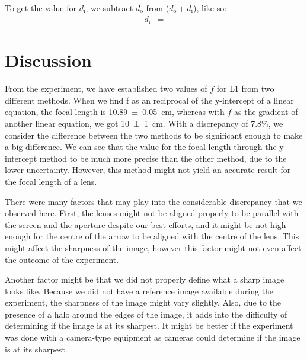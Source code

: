 \documentclass[letter,12pt]{article}
\numberwithin{equation}{section}
\numberwithin{figure}{section}
\numberwithin{table}{section}
\newcommand{\dist}[1] {\(d_{\mathrm{#1}}\)}
\newcommand{\mdist}[1] {d_{\mathrm{#1}}}
\begin{document}
To get the value for \dist{i}, we subtract \dist{o} from (\(\mdist{o} + \mdist{i}\)), like so:
\begin{align*}
  \mdist{i} &= 
\end{align*}


\section{Discussion}
From the experiment, we have established two values of \(f\) for L1 from two different methods. When we find f as an reciprocal of the y-intercept of a linear equation, the focal length is \SI{10.89(5)}{\cm}, whereas with \(f\) as the gradient of another linear equation, we got \SI{10(1)}{\cm}. With a discrepancy of 7.8\%, we consider the difference between the two methods to be significant enough to make a big difference. We can see that the value for the focal length through the y-intercept method to be much more precise than the other method, due to the lower uncertainty. However, this method might not yield an accurate result for the focal length of a lens.

There were many factors that may play into the considerable discrepancy that we observed here. First, the lenses might not be aligned properly to be parallel with the screen and the aperture despite our best efforts, and it might be not high enough for the centre of the arrow to be aligned with the centre of the lens. This might affect the sharpness of the image, however this factor might not even affect the outcome of the experiment.

Another factor might be that we did not properly define what a sharp image looks like. Because we did not have a reference image available during the experiment, the sharpness of the image might vary slightly. Also, due to the presence of a halo around the edges of the image, it adds into the difficulty of determining if the image is at its sharpest. It might be better if the experiment was done with a camera-type equipment as cameras could determine if the image is at its sharpest.
\end{document}
